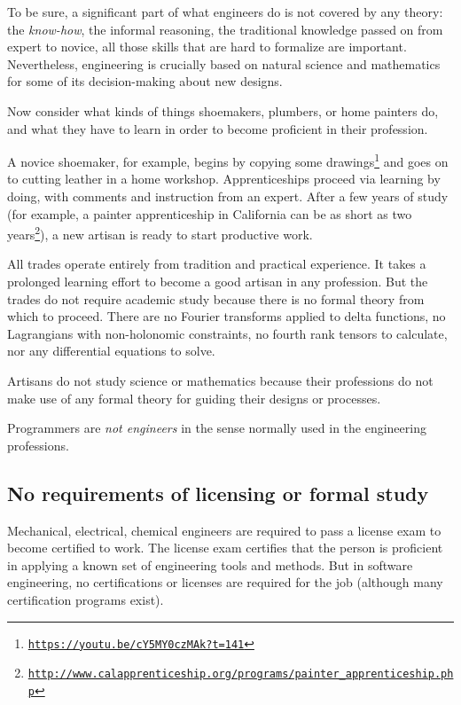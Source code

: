 To be sure, a significant part of what engineers do is not covered
by any theory: the \emph{know-how}, the informal reasoning, the traditional
knowledge passed on from expert to novice,  \textemdash{} all those
skills that are hard to formalize are important. Nevertheless, engineering
is crucially based on natural science and mathematics for some of
its decision-making about new designs.


Now consider what kinds of things shoemakers, plumbers, or home painters
do, and what they have to learn in order to become proficient in their
profession.

A novice shoemaker, for example, begins by copying some drawings\footnote{\texttt{\href{https://youtu.be/cY5MY0czMAk?t=141}{https://youtu.be/cY5MY0czMAk?t=141}}}
and goes on to cutting leather in a home workshop. Apprenticeships
proceed via learning by doing, with comments and instruction from
an expert. After a few years of study (for example, a painter apprenticeship
in California can be as short as two years\footnote{\texttt{\href{http://www.calapprenticeship.org/programs/painter_apprenticeship.php}{http://www.calapprenticeship.org/programs/painter\_apprenticeship.php}}}),
a new artisan is ready to start productive work. 

All trades operate entirely from tradition and practical experience.
It takes a prolonged learning effort to become a good artisan in any
profession. But the trades do not require academic study because there
is no formal theory from which to proceed. There are no Fourier transforms
applied to delta functions, no Lagrangians with non-holonomic constraints,
no fourth rank tensors to calculate, nor any differential equations
to solve.

Artisans do not study science or mathematics because their professions
do not make use of any formal theory for guiding their designs or
processes.


Programmers are \emph{not engineers} in the sense normally used in
the engineering professions.

\subsection*{No requirements of licensing or formal study}

Mechanical, electrical, chemical engineers are required to pass a
license exam to become certified to work. The license exam certifies
that the person is proficient in applying a known set of engineering
tools and methods. But in software engineering, no certifications
or licenses are required for the job (although many certification
programs exist).

